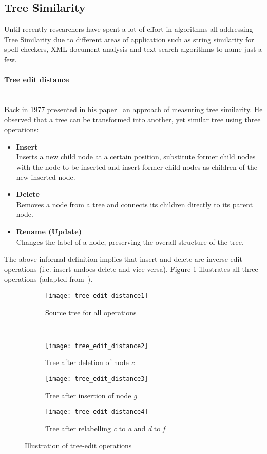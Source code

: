 \documentclass[12pt, notitlepage]{article}
\begin{document}
\subsection{Tree Similarity}
Until recently researchers have spent a lot of effort in algorithms all addressing Tree Similarity due to different areas of application such as string similarity for spell checkers,
XML document analysis and text search algorithms to name just a few.
\paragraph{Tree edit distance} ~\\
Back in 1977 \citeauthor{tree-editing-distance} presented in his paper~\cite{tree-editing-distance} an approach of measuring tree similarity. He observed that a tree can be transformed into another, yet similar tree 
using three operations:
\begin{itemize}
	\item \textbf{Insert}\\
	Inserts a new child node at a certain position, substitute former child nodes with the node to be inserted and insert former child nodes as children of the new inserted node.  
	\item \textbf{Delete}\\
	Removes a node from a tree and connects its children directly to its parent node.
	\item \textbf{Rename (Update)}\\
	Changes the label of a node, preserving the overall structure of the tree.
\end{itemize}
The above informal definition implies that insert and delete are inverse edit operations (i.e. insert undoes delete and vice versa). Figure \ref{fig:tree_operations} illustrates all three operations (adapted from~\cite{tree-edit-distance-survey}). 
\begin{figure}[H]
        \centering
        \begin{subfigure}[h!]{0.3\textwidth}
                \texttt{[image: tree\_edit\_distance1]}
                \caption{Source tree for all operations}
        \end{subfigure}
\\
        \begin{subfigure}[h!]{0.3\textwidth}
                \texttt{[image: tree\_edit\_distance2]}
                \caption{Tree after deletion of node \textit{c}}
        \end{subfigure}
\quad
        \begin{subfigure}[h!]{0.3\textwidth}
                \texttt{[image: tree\_edit\_distance3]}
                \caption{Tree after insertion of node \textit{g}}
        \end{subfigure}
\quad
        \begin{subfigure}[h!]{0.3\textwidth}
                \texttt{[image: tree\_edit\_distance4]}
                \caption{Tree after relabelling \textit{c} to \textit{a} and \textit{d} to \textit{f}}
        \end{subfigure}
        \caption{Illustration of tree-edit operations}\label{fig:tree_operations}
\end{figure}
\end{document}
